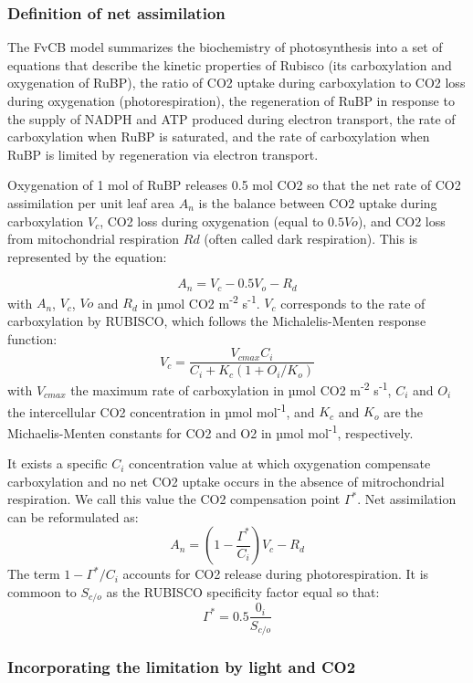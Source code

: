 \documentclass[]{article}
\begin{document}
\hypertarget{definition-of-net-assimilation}{%
\subsubsection{Definition of net
assimilation}\label{definition-of-net-assimilation}}

The FvCB model summarizes the biochemistry of photosynthesis into a set
of equations that describe the kinetic properties of Rubisco (its
carboxylation and oxygenation of RuBP), the ratio of CO2 uptake during
carboxylation to CO2 loss during oxygenation (photorespiration), the
regeneration of RuBP in response to the supply of NADPH and ATP produced
during electron transport, the rate of carboxylation when RuBP is
saturated, and the rate of carboxylation when RuBP is limited by
regeneration via electron transport.

Oxygenation of 1 mol of RuBP releases 0.5 mol CO2 so that the net rate
of CO2 assimilation per unit leaf area \({A_n}\) is the balance between
CO2 uptake during carboxylation \({V_c}\), CO2 loss during oxygenation
(equal to \({0.5Vo}\)), and CO2 loss from mitochondrial respiration
\({Rd}\) (often called dark respiration). This is represented by the
equation:

\[
A_n = V_c -0.5V_o-R_d
\] with \({A_n}\), \({V_c}\), \({Vo}\) and \({R_d}\) in µmol CO2
m\textsuperscript{-2} s\textsuperscript{-1}. \({V_c}\) corresponds to
the rate of carboxylation by RUBISCO, which follows the
Michalelis-Menten response function: \[
V_c=\frac{V_{cmax}C_i}{C_i+K_c(1+O_i/K_o)}
\] with \(V_{cmax}\) the maximum rate of carboxylation in µmol CO2
m\textsuperscript{-2} s\textsuperscript{-1}, \(C_i\) and \(O_i\) the
intercellular CO2 concentration in µmol mol\textsuperscript{-1}, and
\(K_c\) and \(K_o\) are the Michaelis-Menten constants for CO2 and O2 in
µmol mol\textsuperscript{-1}, respectively.

It exists a specific \(C_i\) concentration value at which oxygenation
compensate carboxylation and no net CO2 uptake occurs in the absence of
mitrochondrial respiration. We call this value the CO2 compensation
point \(\Gamma^*\). Net assimilation can be reformulated as: \[
A_n=(1-\frac{\Gamma^*}{C_i})V_c-R_d
\] The term \(1-\Gamma^*/C_i\) accounts for CO2 release during
photorespiration. It is commoon to \(S_{c/o}\) as the RUBISCO
specificity factor equal so that: \[
\Gamma^*=0.5\frac{0_i}{S_{c/o}}
\]

\hypertarget{incorporating-the-limitation-by-light-and-co2}{%
\subsubsection{Incorporating the limitation by light and
CO2}\label{incorporating-the-limitation-by-light-and-co2}}
\end{document}
